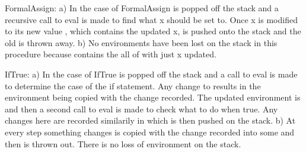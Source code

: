 \documentclass{book}
\begin{document}
\begin{mdP}[data-line={138}]%
{}FormalAssign: a) In the case of FormalAssign %
{}\mdSpan[class={math-inline},elem={math-inline}]{$\rho$}%
{} is popped off the stack and a 
recursive call to eval is made to find what x should be set to. Once x is modified to 
its new value %
{}\mdSpan[class={math-inline},elem={math-inline}]{$\rho \prime$}%
{}, which contains the updated x, is pushed onto the stack and 
the old %
{}\mdSpan[class={math-inline},elem={math-inline}]{$\rho$}%
{} is thrown away. b) No environments have been lost on the stack in this 
procedure because %
{}\mdSpan[class={math-inline},elem={math-inline}]{$\rho \prime$}%
{} contains the all of %
{}\mdSpan[class={math-inline},elem={math-inline}]{$\rho$}%
{} with just x updated.%
\end{mdP}%
\begin{mdP}[class={indent},data-line={144}]%
{}IfTrue: a) In the case of IfTrue %
{}\mdSpan[class={math-inline},elem={math-inline}]{$\rho$}%
{} is popped off the stack and a call to eval is 
made to determine the case of the if statement. Any change to %
{}\mdSpan[class={math-inline},elem={math-inline}]{$\rho$}%
{} results in the 
environment being copied with the change recorded. The updated environment is %
{}\mdSpan[class={math-inline},elem={math-inline}]{$\rho \prime$}%
{} and then a second call to eval is made to check what to do when true. Any 
changes here are recorded similarily in %
{}\mdSpan[class={math-inline},elem={math-inline}]{$\rho \prime \prime$}%
{} which is then pushed on 
the stack. b) At every step something changes %
{}\mdSpan[class={math-inline},elem={math-inline}]{$\rho$}%
{} is copied with the change recorded 
into some %
{}\mdSpan[class={math-inline},elem={math-inline}]{$\rho \prime$}%
{} and then %
{}\mdSpan[class={math-inline},elem={math-inline}]{$\rho$}%
{} is thrown out. There is no loss of environment 
on the stack.%
\end{mdP}%
\end{document}
